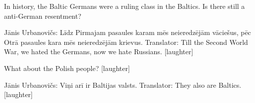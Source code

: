In history, the Baltic Germans were a ruling class in the Baltics. Is there still a anti-German resentment? 

Jānis Urbanovičs: Līdz Pirmajam pasaules karam mēs neieredzējām vāciešus, pēc Otrā pasaules kara mēs neieredzējām krievus.  
Translator: Till the Second World War, we hated the Germans, now we hate Russians. [laughter]  

What about the Polish people? [laughter]  

Jānis Urbanovičs: Viņi arī ir Baltijas valsts. 
Translator: They also are Baltics. [laughter] 